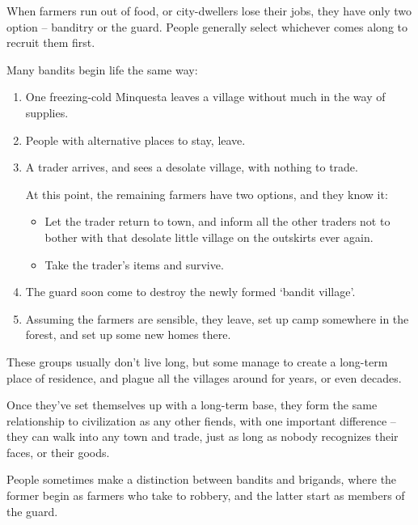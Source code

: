 \begin{multicols}{2}

\noindent
When farmers run out of food, or city-dwellers lose their jobs, they have only two option -- banditry or the \gls{guard}.
People generally select whichever comes along to recruit them first.

Many bandits begin life the same way:

\begin{enumerate}
  \item
  One freezing-cold \gls{Minquesta} leaves a \gls{village} without much in the way of supplies.
  \item
  People with alternative places to stay, leave.
  \item
  A trader arrives, and sees a desolate \gls{village}, with nothing to trade.

  At this point, the remaining farmers have two options, and they know it:
  \begin{itemize}
    \item
    Let the trader return to town, and inform all the other traders not to bother with that desolate little \gls{village} on the outskirts ever again.
    \item
    Take the trader's items and survive.
  \end{itemize}
  \item
  The \gls{guard} soon come to destroy the newly formed `bandit \gls{village}'.
  \item
  Assuming the farmers are sensible, they leave, set up camp somewhere in the forest, and set up some new homes there.
\end{enumerate}

These groups usually don't live long, but some manage to create a long-term place of residence, and plague all the \glspl{village} around for years, or even decades.

Once they've set themselves up with a long-term base, they form the same relationship to civilization as any other fiends, with one important difference -- they can walk into any town and trade, just as long as nobody recognizes their faces, or their goods.

People sometimes make a distinction between bandits and brigands, where the former begin as farmers who take to robbery, and the latter start as members of the \gls{guard}.




\end{multicols}
